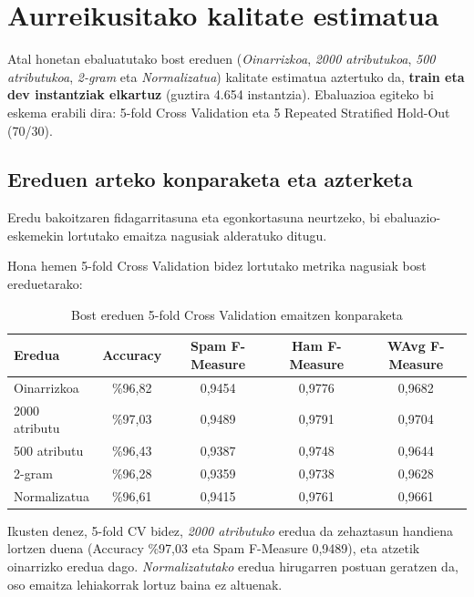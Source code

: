 \documentclass[12pt, a4paper]{article}
\begin{document}
\section{Aurreikusitako kalitate estimatua}

Atal honetan ebaluatutako bost ereduen (\textit{Oinarrizkoa}, \textit{2000 atributukoa}, \textit{500 atributukoa}, \textit{2-gram} eta \textit{Normalizatua}) kalitate estimatua aztertuko da, \textbf{train eta dev instantziak elkartuz} (guztira 4.654 instantzia). Ebaluazioa egiteko bi eskema erabili dira: 5-fold Cross Validation eta 5 Repeated Stratified Hold-Out (70/30).

\subsection{Ereduen arteko konparaketa eta azterketa}

Eredu bakoitzaren fidagarritasuna eta egonkortasuna neurtzeko, bi ebaluazio-eskemekin lortutako emaitza nagusiak alderatuko ditugu.

Hona hemen 5-fold Cross Validation bidez lortutako metrika nagusiak bost ereduetarako:

\begin{table}[H]
    \centering
    \caption{Bost ereduen 5-fold Cross Validation emaitzen konparaketa}
    \begin{tabular}{lcccc}
        \toprule
        \textbf{Eredua} & \textbf{Accuracy} & \textbf{Spam F-Measure} & \textbf{Ham F-Measure} & \textbf{WAvg F-Measure} \\
        \midrule
        Oinarrizkoa   & \%96,82 & 0,9454 & 0,9776 & 0,9682 \\
        2000 atributu & \%97,03 & 0,9489 & 0,9791 & 0,9704 \\
        500 atributu  & \%96,43 & 0,9387 & 0,9748 & 0,9644 \\
        2-gram        & \%96,28 & 0,9359 & 0,9738 & 0,9628 \\
        Normalizatua  & \%96,61 & 0,9415 & 0,9761 & 0,9661 \\
        \bottomrule
    \end{tabular}
\end{table}

Ikusten denez, 5-fold CV bidez, \textit{2000 atributuko} eredua da zehaztasun handiena lortzen duena (Accuracy \%97,03 eta Spam F-Measure 0,9489), eta atzetik oinarrizko eredua dago. \textit{Normalizatutako} eredua hirugarren postuan geratzen da, oso emaitza lehiakorrak lortuz baina ez altuenak.
\end{document}
